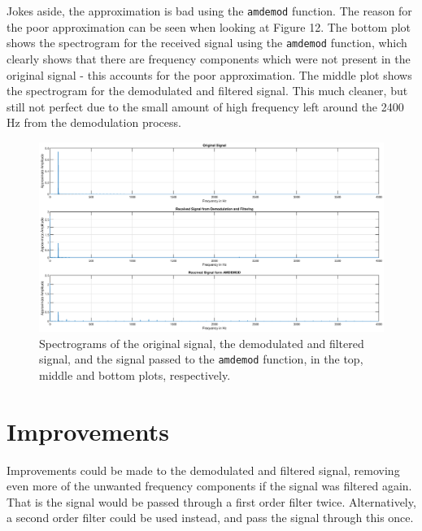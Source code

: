 \documentclass{article}
\begin{document}
Jokes aside, the approximation is bad using the \verb|amdemod| function. The reason for the poor approximation can be seen when looking at Figure 12. The bottom plot shows the spectrogram for the received signal using the \verb|amdemod| function, which clearly shows that there are frequency components which were not present in the original signal - this accounts for the poor approximation. The middle plot shows the spectrogram for the demodulated and filtered signal. This much cleaner, but still not perfect due to the small amount of high frequency left around the 2400 $\si{\hertz}$ from the demodulation process.

\begin{figure}[H]
	\centering
	\includegraphics[scale=0.3]{fig11.eps}
	\cprotect\caption{Spectrograms of the original signal, the demodulated and filtered signal, and the signal passed to the \verb|amdemod| function, in the top, middle and bottom plots, respectively.}
\end{figure}


\section{Improvements}

Improvements could be made to the demodulated and filtered signal, removing even more of the unwanted frequency components if the signal was filtered again. That is the signal would be passed through a first order filter twice. Alternatively, a second order filter could be used instead, and pass the signal through this once.

\end{document}
